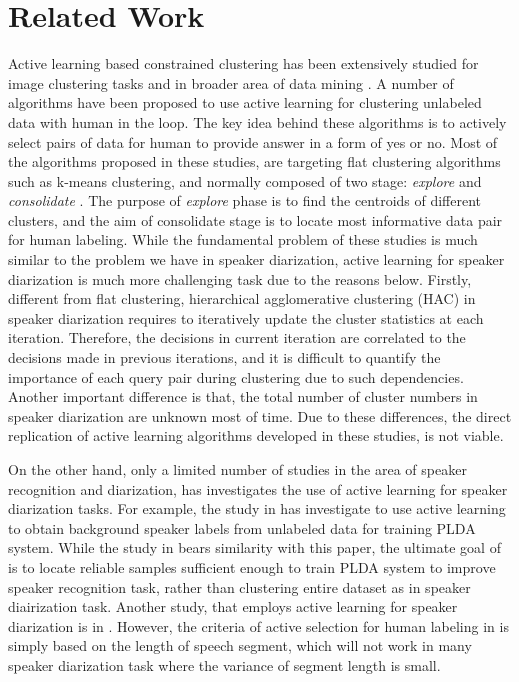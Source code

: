 \documentclass[journal,10pt]{IEEEtran}
\begin{document}
\section{Related Work}
\label{rw}
Active learning based constrained clustering has been extensively studied for image clustering tasks \cite{guo2007optimistic, vijayanarasimhan2010far,biswas2014active} and in broader area of data mining \cite{basu2004active, mallapragada2008active}. A number of algorithms have been proposed to use active learning for clustering unlabeled data with human in the loop. The key idea behind these algorithms is to actively select pairs of data for human to provide answer in a form of yes or no. 
Most of the algorithms proposed in these studies, are targeting flat clustering algorithms such as k-means clustering, and normally composed of two stage: \textit{explore} and \textit{consolidate} \cite{basu2004active, mallapragada2008active}. The purpose of \textit{explore} phase is to find the centroids of different clusters, and the aim of consolidate stage is to locate most informative data pair for human labeling. While the fundamental problem of these studies is much similar to the problem we have in speaker diarization, active learning for speaker diarization is much more challenging task due to the reasons below. Firstly, different from flat clustering, hierarchical agglomerative clustering (HAC) in speaker diarization requires to iteratively update the cluster statistics at each iteration. Therefore, the decisions in current iteration are correlated to the decisions made in previous iterations, and it is difficult to quantify the importance of each query pair during clustering due to such dependencies. Another important difference is that, the total number of cluster numbers in speaker diarization are unknown most of time. Due to these differences, the direct replication of active learning algorithms developed in these studies, is not viable.

On the other hand, only a limited number of studies in the area of speaker recognition and diarization, has investigates the use of active learning for speaker diarization tasks. For example, the study in \cite{shum2014limited} has investigate to use active learning to obtain background speaker labels from unlabeled data for training PLDA system. While the study in \cite{shum2014limited} bears similarity with this paper, the ultimate goal of \cite{shum2014limited} is to locate reliable samples sufficient enough to train PLDA system to improve speaker recognition task, rather than clustering entire dataset as in speaker diairization task. Another study, that employs active learning for speaker diarization is in \cite{mateusz2014active}. However, the criteria of active selection for human labeling in \cite{mateusz2014active} is simply based on the length of speech segment, which will not work in many speaker diarization task where the variance of segment length is small.
\end{document}
